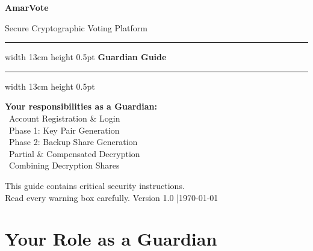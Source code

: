 \documentclass[12pt,a4paper]{book}
\begin{document}
\begin{titlepage}
\pagecolor{coverbg}
\color{white}
\centering
\vspace*{1.5cm}

{\fontsize{55}{60}\selectfont\bfseries AmarVote}

\vspace{0.4cm}
{\large\color{guardaccent} Secure Cryptographic Voting Platform}

\vspace{1.5cm}
\hrule width 13cm height 0.5pt
\vspace{0.5cm}
{\LARGE\bfseries \faShieldAlt\quad Guardian Guide}
\vspace{0.5cm}
\hrule width 13cm height 0.5pt

\vspace{2cm}

\begin{tcolorbox}[
  enhanced,width=11cm,
  colback=guardgreen!30!black,colframe=guardaccent,
  arc=6pt,boxrule=1.5pt,left=14pt,right=14pt,top=10pt,bottom=10pt
]
\centering\color{white}
\textbf{Your responsibilities as a Guardian:}\\[8pt]
\textcolor{guardaccent}{\faUserShield} \, Account Registration \& Login\\[4pt]
\textcolor{guardaccent}{\faKey} \, Phase 1: Key Pair Generation\\[4pt]
\textcolor{guardaccent}{\faCopy} \, Phase 2: Backup Share Generation\\[4pt]
\textcolor{guardaccent}{\faLockOpen} \, Partial \& Compensated Decryption\\[4pt]
\textcolor{guardaccent}{\faLayerGroup} \, Combining Decryption Shares
\end{tcolorbox}

\vfill
{\small\color{sectiongray}
  \faExclamationCircle\quad This guide contains critical security instructions.\\
  Read every warning box carefully.
}
\vspace{1cm}
{\small Version 1.0 \quad|\quad \today}
\end{titlepage}
\nopagecolor\color{black}

\frontmatter
\tableofcontents

\chapter*{Your Role as a Guardian}
\end{document}
